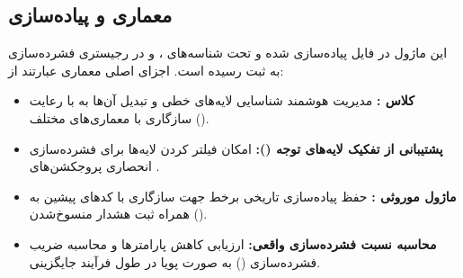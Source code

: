 \subsection{معماری و پیاده‌سازی}
این ماژول در فایل  پیاده‌سازی شده و تحت شناسه‌های ،  و  در رجیستری فشرده‌سازی به ثبت رسیده است. اجزای اصلی معماری عبارتند از:
\begin{itemize}
    \item \textbf{کلاس :} مدیریت هوشمند شناسایی لایه‌های خطی و تبدیل آن‌ها به  با رعایت سازگاری با معماری‌های مختلف ().
    \item \textbf{پشتیبانی از تفکیک لایه‌های توجه ():} امکان فیلتر کردن لایه‌ها برای فشرده‌سازی انحصاری پروجکشن‌های .
    \item \textbf{ماژول موروثی :} حفظ پیاده‌سازی تاریخی برخط جهت سازگاری با کدهای پیشین به همراه ثبت هشدار منسوخ‌شدن ().
    \item \textbf{محاسبه نسبت فشرده‌سازی واقعی:} ارزیابی کاهش پارامترها و محاسبه ضریب فشرده‌سازی () به صورت پویا در طول فرآیند جایگزینی.
\end{itemize}
